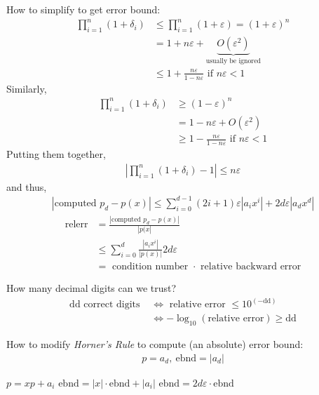 \documentclass[11pt]{article}
\numberwithin{equation}{section}
\begin{document}
How to simplify to get error bound:
\begin{align*}
    \prod_{i=1}^n (1+\delta_i) &\leq \prod_{i=1}^n (1+\varepsilon) = (1+\varepsilon)^n \\
    &= 1+n\varepsilon + \underbrace{O(\varepsilon^2)}_{\text{usually be ignored}} \\
    &\leq 1 + \frac{n \varepsilon}{1-n \varepsilon} \text{ if }n\varepsilon < 1
\end{align*}
Similarly, \begin{align*}
    \prod_{i=1}^n (1+\delta_i) &\geq (1-\varepsilon)^n \\
    &= 1-n\varepsilon + O(\varepsilon^2) \\
    &\geq 1 - \frac{n \varepsilon}{1-n \varepsilon} \text{ if }n\varepsilon < 1
\end{align*}
Putting them together, \begin{align*}
    \left| \prod_{i=1}^n (1+\delta_i) - 1 \right| \leq n \varepsilon
\end{align*}
and thus, \begin{align*}
    |\text{computed }p_d - p(x)| \leq \sum_{i=0}^{d-1}(2 i+1) \varepsilon\left|a_{i} x^{i}\right| + 2d\varepsilon \left|a_{d} x^{d}\right|
\end{align*}
\begin{align*}
    \mathrm{relerr} &= \frac{|\text{computed }p_d - p(x)|}{|p(x|} \\
    &\leq \sum_{i=0}^{d} \frac{|a_i x^i|}{|p(x)|}  2d\varepsilon \\
    &= \text{ condition number } \cdot \text{ relative backward error}
\end{align*}

How many decimal digits can we trust? \begin{align*}
    \text{dd correct digits } &\Longleftrightarrow \text{ relative error } \leq 10^(-\mathrm{dd}) \\
    &\Longleftrightarrow -\log_{10}(\text{relative error}) \geq \mathrm{dd}
\end{align*}

How to modify \textit{Horner's Rule} to compute (an absolute) error bound:
\begin{align*}
    p = a_d, \  \mathrm{ebnd} = |a_d|
\end{align*}
\begin{algorithmfrm}
    \begin{algorithmic}[1]
            \State $p = x p + a_i$
            \State $\mathrm{ebnd} = |x| \cdot \mathrm{ebnd} + |a_i|$
            \EndFor
        \State $\mathrm{ebnd} = 2d \varepsilon \cdot \mathrm{ebnd}$
    \end{algorithmic}
\end{algorithmfrm}
\end{document}
